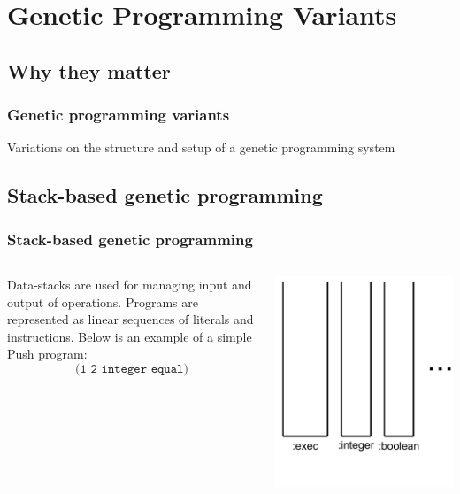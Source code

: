 \documentclass{beamer}
\newcommand{\linespace}{\vskip 0.25cm}
\begin{document}
\section[GP Variants]{Genetic Programming Variants}

\subsection{Why they matter}

\begin{frame}
	\frametitle{Genetic programming variants}
	Variations on the structure and setup of a genetic programming system
\end{frame}

\subsection{Stack-based genetic programming}
\begin{frame}
	\frametitle{Stack-based genetic programming}
	\begin{columns}
		\begin{column}{0.6\textwidth}
			Data-stacks are used for managing input and output of operations.
			\linespace
			\linespace
			\linespace
			\pause Programs are represented as linear sequences of literals and instructions. Below is an example of a simple Push program:
			\[\texttt{(1 2 integer\_equal)}\]
		\end{column}
	\begin{column}{0.4\textwidth}
		\pause[0] \includegraphics[height=1.2\textwidth]{Illustrations/empty_stacks.PDF}
	\end{column}
	\end{columns}
\end{frame}
\end{document}
